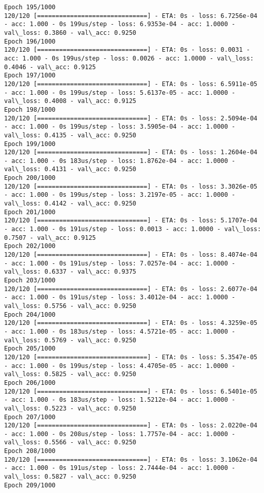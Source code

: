 \documentclass[11pt]{article}
\begin{document}
\begin{Verbatim}[commandchars=\\\{\}]
Epoch 195/1000
120/120 [==============================] - ETA: 0s - loss: 6.7256e-04 - acc: 1.000 - 0s 199us/step - loss: 6.9353e-04 - acc: 1.0000 - val\_loss: 0.3860 - val\_acc: 0.9250
Epoch 196/1000
120/120 [==============================] - ETA: 0s - loss: 0.0031 - acc: 1.000 - 0s 199us/step - loss: 0.0026 - acc: 1.0000 - val\_loss: 0.4046 - val\_acc: 0.9125
Epoch 197/1000
120/120 [==============================] - ETA: 0s - loss: 6.5911e-05 - acc: 1.000 - 0s 199us/step - loss: 5.6137e-05 - acc: 1.0000 - val\_loss: 0.4008 - val\_acc: 0.9125
Epoch 198/1000
120/120 [==============================] - ETA: 0s - loss: 2.5094e-04 - acc: 1.000 - 0s 199us/step - loss: 3.5905e-04 - acc: 1.0000 - val\_loss: 0.4135 - val\_acc: 0.9250
Epoch 199/1000
120/120 [==============================] - ETA: 0s - loss: 1.2604e-04 - acc: 1.000 - 0s 183us/step - loss: 1.8762e-04 - acc: 1.0000 - val\_loss: 0.4131 - val\_acc: 0.9250
Epoch 200/1000
120/120 [==============================] - ETA: 0s - loss: 3.3026e-05 - acc: 1.000 - 0s 199us/step - loss: 3.2197e-05 - acc: 1.0000 - val\_loss: 0.4142 - val\_acc: 0.9250
Epoch 201/1000
120/120 [==============================] - ETA: 0s - loss: 5.1707e-04 - acc: 1.000 - 0s 191us/step - loss: 0.0013 - acc: 1.0000 - val\_loss: 0.7507 - val\_acc: 0.9125
Epoch 202/1000
120/120 [==============================] - ETA: 0s - loss: 8.4074e-04 - acc: 1.000 - 0s 191us/step - loss: 7.0257e-04 - acc: 1.0000 - val\_loss: 0.6337 - val\_acc: 0.9375
Epoch 203/1000
120/120 [==============================] - ETA: 0s - loss: 2.6077e-04 - acc: 1.000 - 0s 191us/step - loss: 3.4012e-04 - acc: 1.0000 - val\_loss: 0.5756 - val\_acc: 0.9250
Epoch 204/1000
120/120 [==============================] - ETA: 0s - loss: 4.3259e-05 - acc: 1.000 - 0s 183us/step - loss: 4.5721e-05 - acc: 1.0000 - val\_loss: 0.5769 - val\_acc: 0.9250
Epoch 205/1000
120/120 [==============================] - ETA: 0s - loss: 5.3547e-05 - acc: 1.000 - 0s 199us/step - loss: 4.4705e-05 - acc: 1.0000 - val\_loss: 0.5825 - val\_acc: 0.9250
Epoch 206/1000
120/120 [==============================] - ETA: 0s - loss: 6.5401e-05 - acc: 1.000 - 0s 183us/step - loss: 1.5212e-04 - acc: 1.0000 - val\_loss: 0.5223 - val\_acc: 0.9250
Epoch 207/1000
120/120 [==============================] - ETA: 0s - loss: 2.0220e-04 - acc: 1.000 - 0s 208us/step - loss: 1.7757e-04 - acc: 1.0000 - val\_loss: 0.5566 - val\_acc: 0.9250
Epoch 208/1000
120/120 [==============================] - ETA: 0s - loss: 3.1062e-04 - acc: 1.000 - 0s 191us/step - loss: 2.7444e-04 - acc: 1.0000 - val\_loss: 0.5827 - val\_acc: 0.9250
Epoch 209/1000

\end{Verbatim}
\end{document}
